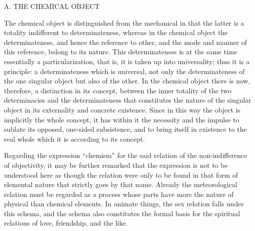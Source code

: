 
A. THE CHEMICAL OBJECT

The chemical object is distinguished from the mechanical
in that the latter is a totality indifferent to determinateness,
whereas in the chemical object the determinateness,
and hence the reference to other,
and the mode and manner of this reference,
belong to its nature.
This determinateness is at the same time
essentially a particularization,
that is, it is taken up into universality;
thus it is a principle:
a determinateness which is universal,
not only the determinateness
of the one singular object
but also of the other.
In the chemical object there is now, therefore,
a distinction in its concept,
between the inner totality of the two determinacies
and the determinateness that constitutes
the nature of the singular object in
its externality and concrete existence.
Since in this way the object is implicitly the whole concept,
it has within it the necessity and the impulse
to sublate its opposed, one-sided subsistence,
and to bring itself in existence to the real whole
which it is according to its concept.

Regarding the expression “chemism” for the said
relation of the non-indifference of objectivity,
it may be further remarked that the expression is not
to be understood here as though the relation were
only to be found in that form of elemental nature
that strictly goes by that name.
Already the meteorological relation must be regarded
as a process whose parts have more the nature
of physical than chemical elements.
In animate things, the sex relation falls under this schema,
and the schema also constitutes the formal basis
for the spiritual relations of love, friendship, and the like.

